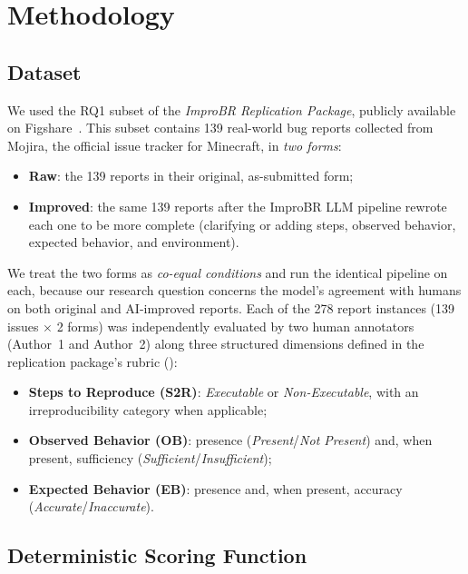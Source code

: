 \section{Methodology}
\label{sec:method}

\subsection{Dataset}
\label{subsec:dataset}

We used the RQ1 subset of the \emph{ImproBR Replication Package}, publicly
available on Figshare~\cite{akyol2026improbr,improbr2026dataset}. This subset
contains 139 real-world bug reports collected from Mojira, the official issue
tracker for Minecraft, in \emph{two forms}:

\begin{itemize}
  \item \textbf{Raw}: the 139 reports in their original, as-submitted form;
  \item \textbf{Improved}: the same 139 reports after the ImproBR LLM pipeline
  rewrote each one to be more complete (clarifying or adding steps, observed
  behavior, expected behavior, and environment).
\end{itemize}

We treat the two forms as \emph{co-equal conditions} and run the identical
pipeline on each, because our research question concerns the model's agreement
with humans on both original and AI-improved reports. Each of the 278 report
instances (139 issues $\times$ 2 forms) was independently evaluated by two human
annotators (Author~1 and Author~2) along three structured dimensions defined in
the replication package's rubric ():

\begin{itemize}
  \item \textbf{Steps to Reproduce (S2R)}: \emph{Executable} or
  \emph{Non-Executable}, with an irreproducibility category when applicable;
  \item \textbf{Observed Behavior (OB)}: presence (\emph{Present}/\emph{Not
  Present}) and, when present, sufficiency (\emph{Sufficient}/\emph{Insufficient});
  \item \textbf{Expected Behavior (EB)}: presence and, when present, accuracy
  (\emph{Accurate}/\emph{Inaccurate}).
\end{itemize}

\subsection{Deterministic Scoring Function}
\label{subsec:scoring}

